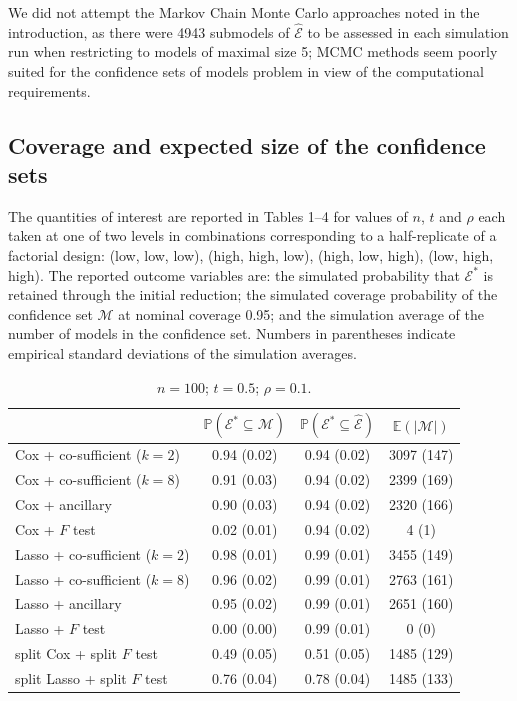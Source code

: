 \documentclass[10pt, reqno]{amsart}
\numberwithin{equation}{section}
\begin{document}
We did not attempt the Markov Chain Monte Carlo approaches noted in the introduction, as there were 4943 submodels of $\hat{\mathcal{E}}$ to be assessed in each simulation run when restricting to models of maximal size 5; MCMC methods seem poorly suited for the confidence sets of models problem in view of the computational requirements.

\subsection{Coverage and expected size of the confidence sets}

The quantities of interest are reported in Tables 1--4 for values of $n$, $t$ and $\rho$ each taken at one of two levels in combinations corresponding to a half-replicate of a factorial design: (low, low, low), (high, high, low), (high, low, high), (low, high, high). The reported outcome variables are: the simulated probability that $\mathcal{E}^*$ is retained through the initial reduction; the simulated coverage probability of the confidence set $\mathcal{M}$ at nominal coverage 0.95; and the simulation average of the number of models in the confidence set. Numbers in parentheses indicate empirical standard deviations of the simulation averages.



\begin{table}
	\caption{$n = 100$; $t = 0.5$; $\rho = 0.1$.}
	{
		\begin{tabular}{|l|c|c|c|}
			\hline
			& $\mathbb{P}(\mathcal E^*\subseteq \mathcal{M})$ &   $\mathbb{P}(\mathcal E^*\subseteq \hat{\mathcal{E}})$ & $\mathbb E(\vert \mathcal{M} \vert)$ \\
			\hline
			Cox + co-sufficient ($k = 2$) & 0.94 (0.02) & 0.94 (0.02) & 3097 (147)   \\
			Cox + co-sufficient ($k = 8$) & 0.91 (0.03) & 0.94 (0.02) & 2399 (169) \\
			Cox + ancillary & 0.90 (0.03) & 0.94 (0.02) & 2320 (166) \\
			Cox + $F$ test & 0.02 (0.01) & 0.94 (0.02) & 4 (1)  \\
			Lasso + co-sufficient ($k = 2$) & 0.98 (0.01) & 0.99 (0.01) & 3455 (149) \\
			Lasso + co-sufficient ($k = 8$) & 0.96 (0.02) & 0.99 (0.01) & 2763 (161) \\
			Lasso + ancillary & 0.95 (0.02) & 0.99 (0.01) & 2651 (160)  \\
			Lasso + $F$ test & 0.00 (0.00) & 0.99 (0.01) & 0 (0) \\
			split Cox + split $F$ test & 0.49 (0.05) & 0.51 (0.05) & 1485 (129) \\
			split Lasso + split $F$ test & 0.76 (0.04) & 0.78 (0.04) & 1485 (133) \\
			\hline
		\end{tabular}
		\label{tab1}
	}
\end{table}
\end{document}
